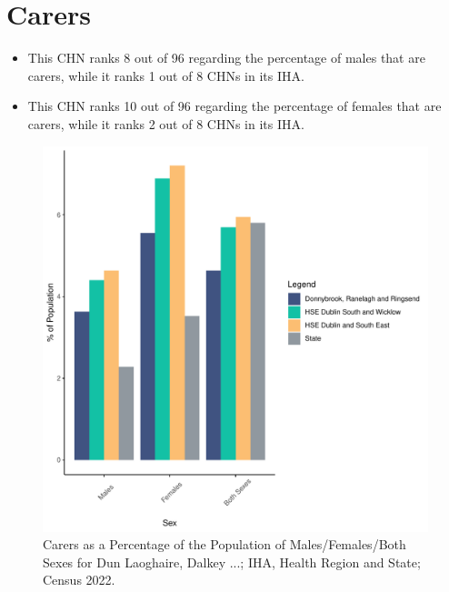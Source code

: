 \documentclass{article}
\begin{document}
\section{Carers}\label{sect:Carers}
\begin{itemize}
\item This CHN ranks  8 out of 96 regarding the percentage of males that are carers, while it ranks   1 out of 8 CHNs in its IHA.
\item This CHN ranks  10 out of 96 regarding the percentage of females that are carers, while it ranks   2 out of 8 CHNs in its IHA.
\end{itemize}
\begin{figure}[H]
	\centering
	\includegraphics[width = 150mm]{../figures/CareED.pdf}
	\caption{Carers as a Percentage of the Population of Males/Females/Both Sexes for Dun Laoghaire, Dalkey ...; IHA, Health Region and State; Census 2022.}
	\label{fig:2ae19629-1a6a-13a3-e055-000000000001}
	\end{figure}
\end{document}
